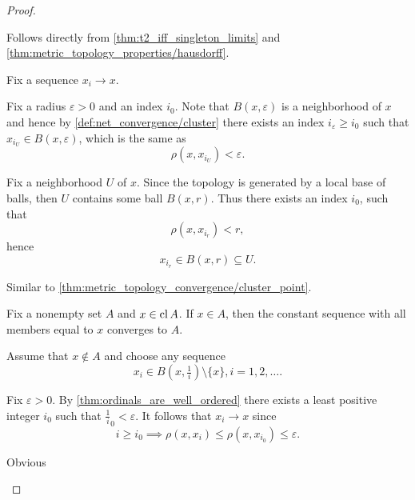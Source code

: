 \begin{proof}
  \begin{description}
     Follows directly from \cref{thm:t2_iff_singleton_limits} and \cref{thm:metric_topology_properties/hausdorff}.

     Fix a sequence \( x_i \to x \).

    \begin{description}
      \Implies Fix a radius \( \varepsilon > 0 \) and an index \( i_0 \). Note that \( B(x, \varepsilon) \) is a neighborhood of \( x \) and hence by \cref{def:net_convergence/cluster} there exists an index \( i_\varepsilon \geq i_0 \) such that \( x_{i_U} \in B(x, \varepsilon) \), which is the same as
      \begin{equation*}
        \rho(x, x_{i_U}) < \varepsilon.
      \end{equation*}

      \ImpliedBy Fix a neighborhood \( U \) of \( x \). Since the topology is generated by a local base of balls, then \( U \) contains some ball \( B(x, r) \). Thus there exists an index \( i_0 \), such that
      \begin{equation*}
        \rho(x, x_{i_r}) < r,
      \end{equation*}
      hence
      \begin{equation*}
        x_{i_r} \in B(x, r) \subseteq U.
      \end{equation*}
    \end{description}

     Similar to \ref{thm:metric_topology_convergence/cluster_point}.

    \begin{description}
      \Implies Fix a nonempty set \( A \) and \( x \in \operatorname{cl} A \). If \( x \in A \), then the constant sequence with all members equal to \( x \) converges to \( A \).

      Assume that \( x \not\in A \) and choose any sequence\AOC
      \begin{equation*}
        x_i \in B(x, \tfrac 1 i) \setminus \{ x \}, i = 1, 2, \ldots.
      \end{equation*}

      Fix \( \varepsilon > 0 \). By \cref{thm:ordinals_are_well_ordered} there exists a least positive integer \( i_0 \) such that \( \tfrac 1 i_0 < \varepsilon \). It follows that \( x_i \to x \) since
      \begin{equation*}
        i \geq i_0 \implies \rho(x, x_i) \leq \rho(x, x_{i_0}) \leq \varepsilon.
      \end{equation*}

      \ImpliedBy Obvious
    \end{description}
  \end{description}
\end{proof}

